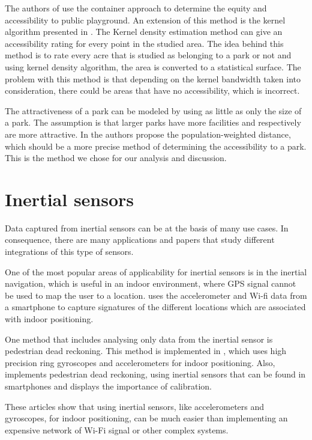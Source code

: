 The authors of \cite{talen1998assessing} use the container approach to determine the equity and accessibility to public playground. An extension of this method is the kernel algorithm presented in \cite{maroko2009complexities}. The Kernel density estimation method can give an accessibility rating for every point in the studied area. The idea behind this method is to rate every acre that is studied as belonging to a park or not and using kernel density algorithm, the area is converted to a statistical surface. The problem with this method is that depending on the kernel bandwidth taken into consideration, there could be areas that have no accessibility, which is incorrect.

The attractiveness of a park can be modeled by using as little as only the size of a park. The assumption is that larger parks have more facilities and respectively are more attractive. In \cite{zhang2011modeling} the authors propose the population-weighted distance, which should be a more precise method of determining the accessibility to a park. This is the method we chose for our analysis and discussion.

\section{Inertial sensors}
\label{sec:related-acc}

Data captured from inertial sensors can be at the basis of many use cases. In consequence, there are many applications and papers that study different integrations of this type of sensors.

One of the most popular areas of applicability for inertial sensors is in the inertial navigation, which is useful in an indoor environment, where GPS signal cannot be used to map the user to a location. \cite{Wang-2012} uses the accelerometer and Wi-fi data from a smartphone to capture signatures of the different locations which are associated with indoor positioning.

One method that includes analysing only data from the inertial sensor is  pedestrian dead reckoning. This method is implemented in \cite{Collin-2003}, which uses high precision ring gyroscopes and accelerometers for indoor positioning. Also, \cite{Huang-2014} implements pedestrian dead reckoning, using inertial sensors that can be found in smartphones and displays the importance of calibration.

These articles show that using inertial sensors, like accelerometers and gyroscopes, for indoor positioning, can be much easier than implementing an expensive network of Wi-Fi signal or other complex systems.


